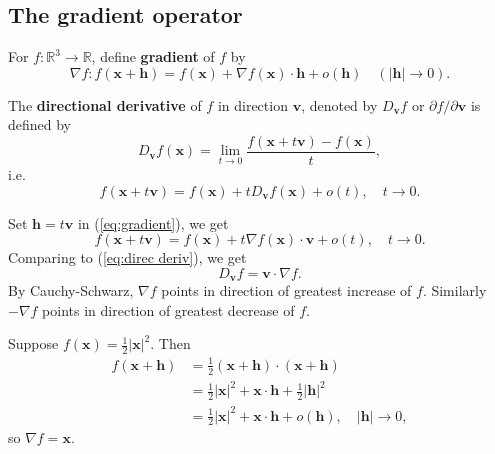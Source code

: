 \subsection{The gradient operator}
\begin{definition}[Gradient]
    For $ f: \mathbb{R}^{3}\to \mathbb{R} $, define \textbf{gradient} of $f$ by 
    \begin{equation}\label{eq:gradient}\tag{$ * $}
        \nabla f : f(\mathbf{x}+\mathbf{h}) = f(\mathbf{x})+ \nabla f(\mathbf{x}) \cdot \mathbf{h}+o(\mathbf{h})\quad (|\mathbf{h}|\to 0).
    \end{equation}
\end{definition}
\begin{definition}
    The \textbf{directional derivative} of $f$ in direction $\mathbf{v}$, denoted by $ D_\mathbf{v} f $ or $ \partial f/\partial \mathbf{v}  $ is defined by 
    \[
        D_\mathbf{v} f(\mathbf{x}) = \lim_{t \to 0} \frac{f(\mathbf{x}+t\mathbf{v})-f(\mathbf{x})}{t}, 
    \]
    i.e.
    \begin{equation}\label{eq:direc deriv}\tag{$ ** $}
        f(\mathbf{x}+t\mathbf{v})=f(\mathbf{x})+t D_\mathbf{v} f(\mathbf{x})+o(t),\quad t\to 0. 
    \end{equation}
\end{definition}

Set $ \mathbf{h}=t\mathbf{v} $ in (\ref{eq:gradient}), we get 
\[
    f(\mathbf{x}+t\mathbf{v}) = f(\mathbf{x})+t \nabla f(\mathbf{x}) \cdot \mathbf{v} + o(t),\quad t\to 0.
\]
Comparing to (\ref{eq:direc deriv}), we get 
\[
    D_\mathbf{v} f = \mathbf{v} \cdot \nabla f.
\]
By Cauchy-Schwarz, $ \nabla f $ points in direction of greatest increase of $f$. Similarly $ - \nabla f $ points in direction of greatest decrease of $f$.

\begin{example}
    Suppose $ f(\mathbf{x}) = \frac{1}{2}|\mathbf{x}|^2 $. Then 
    \begin{align*}
        f(\mathbf{x}+\mathbf{h}) &= \frac{1}{2}(\mathbf{x}+\mathbf{h})\cdot (\mathbf{x}+\mathbf{h})\\ 
        &= \frac{1}{2}|\mathbf{x}|^2+ \mathbf{x} \cdot \mathbf{h}+\frac{1}{2}|\mathbf{h}|^2\\ 
        &= \frac{1}{2}|\mathbf{x}|^2+\mathbf{x} \cdot \mathbf{h}+o(\mathbf{h}),\quad |\mathbf{h}|\to 0,
    \end{align*}
    so $ \nabla f =\mathbf{x} $.
\end{example}

